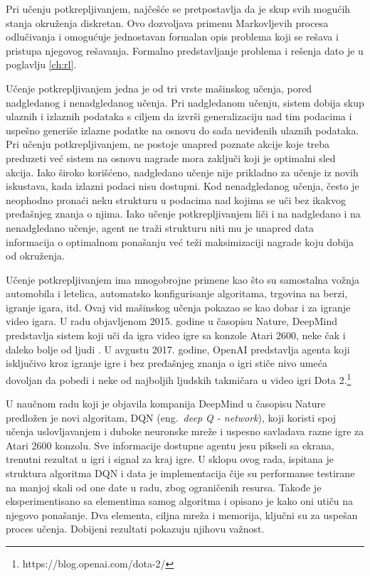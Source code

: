 \par
Pri učenju potkrepljivanjem, najčešće se pretpostavlja da je skup svih mogućih stanja okruženja diskretan. Ovo dozvoljava primenu Markovljevih procesa odlučivanja i omogućuje jednostavan formalan opis problema koji se rešava i pristupa njegovog rešavanja. Formalno predstavljanje problema i rešenja dato je u poglavlju \ref{ch:rl}.
\par
Učenje potkrepljivanjem jedna je od tri vrste mašinskog učenja, pored nadgledanog i nenadgledanog učenja. Pri nadgledanom učenju, sistem dobija skup ulaznih i izlaznih podataka s ciljem da izvrši generalizaciju nad tim podacima i uspešno generiše izlazne podatke na osnovu do sada neviđenih ulaznih podataka. Pri učenju potkrepljivanjem, ne postoje unapred poznate akcije koje treba preduzeti već sistem na osnovu nagrade mora zaključi koji je optimalni sled akcija. Iako široko korišćeno, nadgledano učenje nije prikladno za učenje iz novih iskustava, kada izlazni podaci nisu dostupni.  Kod nenadgledanog učenja, često je neophodno pronaći neku strukturu u podacima nad kojima se uči bez ikakvog pređašnjeg znanja o njima. Iako učenje potkrepljivanjem liči i na nadgledano i na nenadgledano učenje, agent ne traži strukturu niti mu je unapred data informacija o optimalnom ponašanju već teži maksimizaciji nagrade koju dobija od okruženja. \par
\par
Učenje potkrepljivanjem ima mnogobrojne primene kao što su samostalna vožnja automobila i letelica, automatsko konfigurisanje algoritama, trgovina na berzi, igranje igara, itd. Ovaj vid mašinskog učenja pokazao se kao dobar i za igranje video igara.  U radu objavljenom 2015. godine u časopisu Nature, DeepMind predstavlja sistem koji uči da igra video igre sa konzole Atari 2600, neke čak i daleko bolje od ljudi \cite{dqn_dm}. U avgustu 2017. godine, OpenAI predstavlja agenta koji isključivo kroz igranje igre i bez pređašnjeg znanja o igri stiče nivo umeća dovoljan da pobedi i neke od najboljih ljudskih takmičara u video igri Dota 2.\footnote{https://blog.openai.com/dota-2/} 
\par 
U naučnom radu koji je objavila kompanija DeepMind u časopisu Nature predložen je novi algoritam, DQN (eng.~{\em deep Q - network}), koji koristi spoj učenja uslovljavanjem i duboke neuronske mreže i uspesno savladava razne igre za Atari 2600 konzolu. Sve informacije dostupne agentu jesu pikseli sa ekrana, trenutni rezultat u igri i signal za kraj igre. U sklopu ovog rada, ispitana je struktura algoritma DQN i data je implementacija čije su performanse testirane na manjoj skali od one date u radu, zbog ograničenih resursa. Takođe je eksperimentisano sa elementima samog algoritma i opisano je kako oni utiču na njegovo ponašanje. Dva elementa, ciljna mreža i memorija, ključni su za uspešan proces učenja. Dobijeni rezultati pokazuju njihovu važnost. 
